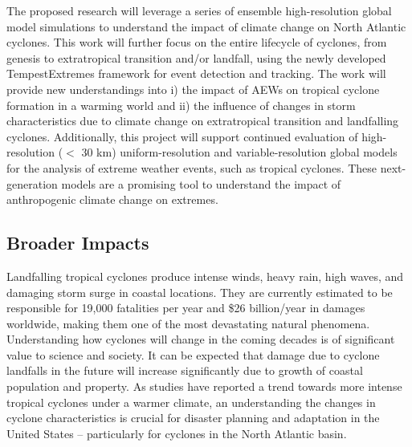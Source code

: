 \documentclass[11pt]{article}
\begin{document}
The proposed research will leverage a series of ensemble high-resolution global model simulations to understand the impact of climate change on North Atlantic cyclones. This work will further focus on the entire lifecycle of cyclones, from genesis to extratropical transition and/or landfall, using the newly developed TempestExtremes framework for event detection and tracking.  The work will provide new understandings into i) the impact of AEWs on tropical cyclone formation in a warming world and ii) the influence of changes in storm characteristics due to climate change on extratropical transition and landfalling cyclones. Additionally, this project will support continued evaluation of high-resolution ($<$ 30 km) uniform-resolution and variable-resolution global models for the analysis of extreme weather events, such as tropical cyclones.  These next-generation models are a promising tool to understand the impact of anthropogenic climate change on extremes.  

\vspace{-0.7cm}
\subsection*{Broader Impacts}
\vspace{-0.6cm}

Landfalling tropical cyclones produce intense winds, heavy rain, high waves, and damaging storm surge in coastal locations. They are currently estimated to be responsible for 19,000 fatalities per year and \$26 billion/year in damages worldwide, making them one of the most devastating natural phenomena.  Understanding how cyclones will change in the coming decades is of significant value to science and society. It can be expected that damage due to cyclone landfalls in the future will increase significantly due to growth of coastal population and property.  As studies have reported a trend towards more intense tropical cyclones under a warmer climate, an understanding the changes in cyclone characteristics is crucial for disaster planning and adaptation in the United States -- particularly for cyclones in the  North Atlantic basin.
\end{document}
